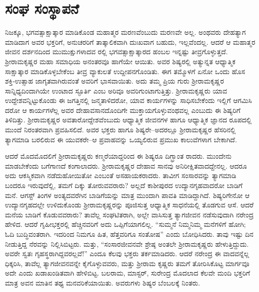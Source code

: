 
\chapter{ಸಂಘ ಸಂಸ್ಥಾಪನೆ}

\noindent

ನಿಜಕ್ಕೂ, ಭಗವತ್ಸಾಕ್ಷಾತ್ಕಾರ ಮಾಡಿಕೊಂಡ ಮಹಾತ್ಮರ ಮರಣವೆಂಬುದು ಮರಣವೇ ಅಲ್ಲ. ಅಂಥವರು ದೇಹತ್ಯಾಗ ಮಾಡಿದಾಗ ಅವರ ಭಕ್ತರಿಗೆ, ಅನುಚರರಿಗೆ ತಾತ್ಕಾಲಿಕವಾಗಿ ದುಃಖವಾಗ ಬಹುದು, ಇಲ್ಲವೆಂದಲ್ಲ. ಆದರೆ ಆ ಮಹಾತ್ಮರ ಜೀವನ ದರ್ಶನದಿಂದ ಮುಮುಕ್ಷುಗಳಾದವ ರಲ್ಲಿ ಭಗವತ್ಸಾಕ್ಷಾತ್ಕಾರದ ಹಂಬಲ ಇನ್ನಷ್ಟು ತೀವ್ರಗೊಳ್ಳುತ್ತದೆ. ಶ್ರೀರಾಮಕೃಷ್ಣರ ಮಹಾ ಸಮಾಧಿಯ ಅನಂತರವೂ ಹಾಗೆಯೇ ಆಯಿತು. ಅವರ ಶಿಷ್ಯರಲ್ಲಿ ಅತ್ಯುನ್ನತ ಆಧ್ಯಾತ್ಮಿಕ ಸಾಕ್ಷಾತ್ಕಾರ ಮಾಡಿಕೊಳ್ಳಬೇಕೆಂಬ ತೀವ್ರ ವ್ಯಾಕುಲತೆ ಉದ್ದೀಪನಗೊಂಡಿತು. ಈಗ ತಮ್ಮೊಳಗೆ ಏನೋ ಒಂದು ಹೊಸ ಶಕ್ತಿ-ಉತ್ಸಾಹ ಜಾಗೃತವಾಗಿರುವಂತೆ ಅವರಿಗೆ ಭಾಸವಾಯಿತು. ಅದು ತಮ್ಮ ಪ್ರಿಯ ಗುರು ಶ್ರೀರಾಮಕೃಷ್ಣರ ಸಾನ್ನಿಧ್ಯದಿಂದಾಗಿಯೇ ಉಂಟಾದ ಸ್ಫೂರ್ತಿ ಎಂಬ ಅರಿವೂ ಅವರಿಗುಂಟಾಗುತ್ತಿತ್ತು. ಶ್ರೀರಾಮಕೃಷ್ಣರು ಯಾವ ಉದ್ದೇಶವನ್ನಿಟ್ಟುಕೊಂಡು ಈ ಜಗತ್ತಿನಲ್ಲಿ ಜನ್ಮತಾಳಿದರೋ, ಯಾವ ಕಾರ್ಯಗಳನ್ನು ಸಾಧಿಸಬೇಕೆಂದು ಇಲ್ಲಿಗೆ ಆಗಮಿಸಿ ದರೋ ಆ ಕಾರ್ಯಗಳೆಲ್ಲ ಅವರ ದೇಹಾವಸಾನದೊಂದಿಗೇ ಮುಕ್ತಾಯಗೊಳ್ಳುವಂಥವಲ್ಲ ಎಂಬುದು ಈ ಶಿಷ್ಯರಿಗೆ ತಿಳಿದಿತ್ತು. ಶ್ರೀರಾಮಕೃಷ್ಣರ ಅವತಾರೋದ್ದೇಶವೆಂಬುದು ಆಧ್ಯಾತ್ಮಿಕ ಜೀವನಗಳ ಹಾಗೂ ಆಧ್ಯಾತ್ಮಿಕ ಜ್ಞಾನದ ರೂಪದಲ್ಲಿ ಮುಂದೆ ನಿರಂತರವಾಗಿ ಪ್ರವಹಿಸಲಿದೆ. ಅವರ ಭಕ್ತರು ಹಾಗೂ ಶಿಷ್ಯರೇ–ಅದರಲ್ಲೂ ಶ್ರೀರಾಮಕೃಷ್ಣರ ಹೆಸರಿನಲ್ಲಿ ತ್ಯಾಗಮಾಡಿ ಬರಲಿರುವ ಈ ಯುವಕರೇ–ಆ ಪ್ರವಾಹವನ್ನು ಒಯ್ಯಲಿರುವ ಪ್ರಮುಖ ಕಾಲುವೆಗಳಾಗ ಬೇಕಾಗಿದೆ.

ಆದರೆ ಮೊದಮೊದಲಿಗೆ ಶ್ರೀರಾಮಕೃಷ್ಣರು ಕಣ್ಮರೆಯಾದ್ದರಿಂದ ಈ ಶಿಷ್ಯರೂ ದಿಗ್ಭ್ರಾಂತ ರಾದರು. ಮುಂದೇನು ಮಾಡಬೇಕೆಂದು ಬಗೆಗಾಣದೆ ಕಂಗಾಲಾದರು. ಶ್ರೀರಾಮಕೃಷ್ಣರ ದೇಹಾವ ಸಾನವು ಅನಿರೀಕ್ಷಿತವಾದದ್ದೇನಲ್ಲ. ಆದರೂ ಅದು ಆಕಸ್ಮಿಕವಾಗಿ ನಡೆದುಹೋಯಿತೋ ಎಂಬಂತೆ ಅಸಹಾಯಕರಾದರು. ತಾವೀಗ ಸಂಸಾರವನ್ನು ತ್ಯಾಗಮಾಡಿ ಬಂದರೂ ಇರುವುದೆಲ್ಲಿ, ತಮಗೆ ದಿಕ್ಕು ತೋರುವವರಾರು? ಅಲ್ಲದೆ ಕಾಶೀಪುರದ ಉದ್ಯಾನಗೃಹವಾದರೋ ಬಾಡಿಗೆ ಮನೆ. ಆಗಸ್ಟ್ ತಿಂಗಳ ಅಂತ್ಯದವರೆಗಿನ ಬಾಡಿಗೆಯನ್ನು ಮಾತ್ರ ಮುಂದಾಗಿ ಪಾವತಿ ಮಾಡಿದ್ದಾಗಿದೆ. ಶಿಷ್ಯರಿಗೇನೋ ಆ ಉದ್ಯಾನಗೃಹದಲ್ಲೇ ಉಳಿದುಕೊಂಡು ಶ್ರೀರಾಮಕೃಷ್ಣರನ್ನು ಪೂಜಿಸುತ್ತ ಆಧ್ಯಾತ್ಮಿಕ ಸಾಧನೆಯಲ್ಲಿ ತೊಡಗುವ ಆಸೆ. ಆದರೆ ಮನೆಯ ಬಾಡಿಗೆ ಕೊಡುವವರಾರು? ತಾವೆಲ್ಲ ಸಂಘಟಿತರಾಗಿ, ಅಲ್ಲೇ ವಾಸಿಸುತ್ತ ತ್ಯಾಗಜೀವನ ನಡೆಸುವುದಾಗಿ ನರೇಂದ್ರ ಹೇಳಿದ. ಆದರೆ ಗೃಹೀಭಕ್ತರಲ್ಲಿ ಹೆಚ್ಚಿನವರಿಗೆ ಅದು ಒಪ್ಪಿಗೆಯಾಗಲಿಲ್ಲ. “ಸುಮ್ಮನೆ ನಿಮ್ಮನಿಮ್ಮ ಮನೆಗಳಿಗೆ ಹೋಗಿ; ಓದಿ ಬುದ್ಧಿವಂತರಾಗಿ. ಇದರಿಂದ ನಿಮಗೂ ಹಿತ, ಹೆತ್ತವರಿಗೂ ಸಂತೋಷ” ಎಂದು ಬೋಧಿಸಿದರು. ತಾವು ಇಷ್ಟು ದಿನ ನೀಡುತ್ತಿದ್ದ ನೆರವನ್ನು ನಿಲ್ಲಿಸಿಬಿಟ್ಟರು. ಮತ್ತು, “ಸಂಸಾರಜೀವನವೇ ಶ್ರೇಷ್ಠ ಅಂತಲೇ ಶ್ರೀರಾಮಕೃಷ್ಣರು ಹೇಳುತ್ತಿದ್ದುದು. ಅವರೇ ಸ್ವತಃ ಗೃಹಸ್ಥರಾಗಿದ್ದವರಲ್ಲವೆ!” ಎಂದೂ ಕೆಲವು ಭಕ್ತರು ತರ್ಕಮಾಡಿದರು. ಆದರೆ ನರೇಂದ್ರ ಈ ವಾದವನ್ನೆಲ್ಲ ಧಿಕ್ಕರಿಸಿ, ತಾವೆಲ್ಲ ತ್ಯಾಗಜೀವನವನ್ನೇ ಕೈಗೊಳ್ಳುವವರು, ಮತ್ತು ಶ್ರೀರಾಮ ಕೃಷ್ಣರು ತಮಗೆ ತೋರಿಸಿಕೊಟ್ಟ ಮಾರ್ಗವೂ ಅದೇ ಎಂದು ಖಡಾಖಂಡಿತವಾಗಿ ಹೇಳಿಬಿಟ್ಟ. ಬಲರಾಮ, ಮಾಸ್ಟರ್, ಸುರೇಂದ್ರ ಮೊದಲಾದ ಕೆಲವೇ ಮಂದಿ ಭಕ್ತರಿಗೆ ಮಾತ್ರ ಅವನ ಮಾತಿನ ತಥ್ಯ ಮನವರಿಕೆಯಾಯಿತು. ಅವರುಗಳು ಶಿಷ್ಯರ ಬೆಂಬಲಕ್ಕೆ ನಿಂತರು.

